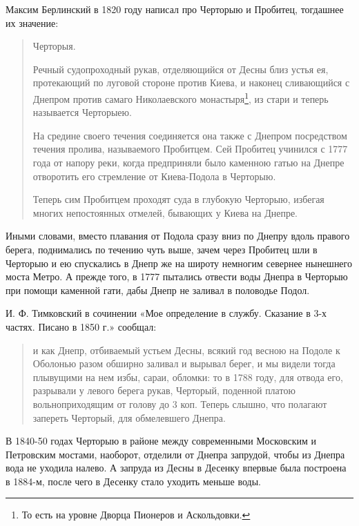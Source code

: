 Максим Берлинский в 1820 году написал\cite{berl01} про Черторыю и Пробитец, тогдашнее их значение:

\begin{quotation}
Черторыя.

Речный судопроходный рукав, отделяющийся от Десны близ устья ея, протекающий по луговой стороне против Киева, и наконец сливающийся с Днепром против самаго Николаевского монастыря\footnote{То есть на уровне Дворца Пионеров и Аскольдовки.}, из стари и теперь называется Черторыею.

На средине своего течения соединяется она также с Днепром  посредством течения пролива, называемого Пробитцем. Сей Пробитец учинился с 1777 года от напору реки, когда предприняли было каменною гатью на Днепре отворотить его стремление от Киева-Подола в Черторыю.

Теперь сим Пробитцем проходят суда в глубокую Черторыю, избегая многих непостоянных отмелей, бывающих у Киева на Днепре.
\end{quotation}

Иными словами, вместо плавания от Подола сразу вниз по Днепру вдоль правого берега, поднимались по течению чуть выше, зачем через Пробитец шли в Черторыю и ею спускались в Днепр же на широту немногим севернее нынешнего моста Метро. А прежде того, в 1777 пытались отвести воды Днепра в Черторыю при помощи каменной гати, дабы Днепр не заливал в половодье Подол.

И. Ф. Тимковский в сочинении «Мое определение в службу. Сказание в 3-х частях. Писано в 1850 г.» сообщал:

\begin{quotation}
и как Днепр, отбиваемый устьем Десны, всякий год весною на Подоле к Оболонью разом обширно заливал и вырывал берег, и мы видели тогда плывущими на нем избы, сараи, обломки: то в 1788 году, для отвода его, разрывали у левого берега рукав, Черторый, поденной платою вольноприходящим от голову до 3 коп. Теперь слышно, что полагают запереть Черторый, для обмелевшего Днепра.
\end{quotation}

В 1840-50 годах Черторыю в районе между современными Московским и Петровским мостами, наоборот, отделили от Днепра запрудой, чтобы из Днепра вода не уходила налево. А запруда из Десны в Десенку впервые была построена в 1884-м, после чего в Десенку стало уходить меньше воды.


